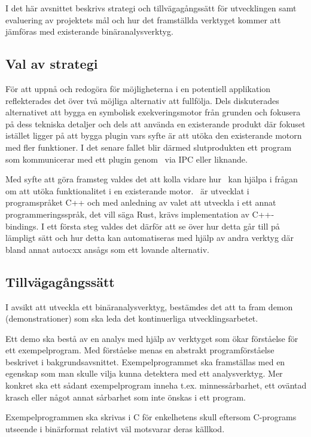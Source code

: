 
I det här avsnittet beskrivs strategi och tillvägagångssätt för utvecklingen
samt evaluering av projektets mål och hur det framställda verktyget kommer att
jämföras med existerande binäranalysverktyg.

\subsection{Val av strategi}

För att uppnå och redogöra för möjligheterna i en potentiell applikation
reflekterades det över två möjliga alternativ att fullfölja. Dels diskuterades
alternativet att bygga en symbolisk exekveringsmotor från grunden och fokusera
på dess tekniska detaljer och dels att använda en existerande produkt där
fokuset istället ligger på att bygga plugin vars syfte är att utöka den
existerande motorn med fler funktioner. I det senare fallet blir därmed
slutprodukten ett program som kommunicerar med ett plugin genom \stoe\ via IPC
eller liknande. 

Med syfte att göra framsteg valdes det att kolla vidare hur \stoe\ kan hjälpa i
frågan om att utöka funktionalitet i en existerande motor. \stoe\ är utvecklat
i programspråket C++ och med anledning av valet att utveckla i ett
annat programmeringsspråk, det vill säga Rust, krävs implementation av
C++-bindings. I ett första steg valdes det därför att se över hur detta går till
på lämpligt sätt och hur detta kan automatiseras med hjälp av andra verktyg
där bland annat autocxx ansågs som ett lovande alternativ.

\subsection{Tillvägagångssätt}

I avsikt att utveckla ett binäranalysverktyg, bestämdes det att ta fram demon
(demonstrationer) som ska leda det kontinuerliga utvecklingsarbetet.

Ett demo ska bestå av en analys med hjälp av verktyget som ökar förståelse för
ett exempelprogram. Med förståelse menas en abstrakt programförståelse
beskrivet i bakgrundsavsnittet. Exempelprogrammet ska framställas med en
egenskap som man skulle vilja kunna detektera med ett analysverktyg. Mer
konkret ska ett sådant exempelprogram inneha t.ex. minnessårbarhet, ett oväntad
krasch eller något annat sårbarhet som inte önskas i ett program.

Exempelprogrammen ska skrivas i C för enkelhetens skull eftersom C-programs
utseende i binärformat relativt väl motsvarar deras källkod. 

